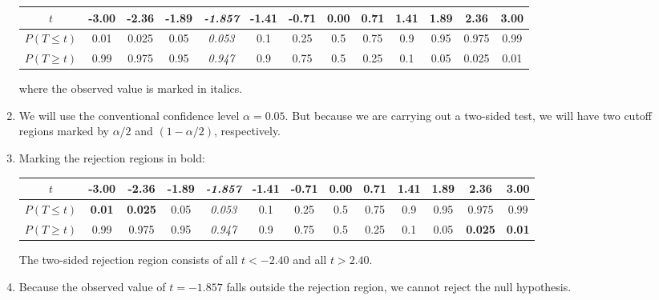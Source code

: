 \begin{enumerate}
  \begin{center}
    \begin{tabular}{c|c@{\gap}c@{\gap}c@{\gap}c@{\gap}
        c@{\gap}c@{\gap}c@{\gap}c@{\gap}c@{\gap}c@{\gap}c@{\gap}c}
      $t$ & -3.00 & -2.36 & -1.89 & \textit{-1.857} & -1.41 & -0.71 &
      0.00 & 0.71 & 1.41 & 1.89 & 2.36 & 3.00 \\ \hline
      $P(T\leq{t})$ & 0.01 & 0.025 & 0.05 & \textit{0.053} & 0.1 & 0.25 &
      0.5 & 0.75 & 0.9 & 0.95 & 0.975 & 0.99 \\
      $P(T\geq{t})$ & 0.99 & 0.975 & 0.95 & \textit{0.947} & 0.9 & 0.75 & 0.5 &
      0.25 & 0.1 & 0.05 & 0.025 & 0.01
    \end{tabular}
  \end{center}
  
  \noindent where the observed value is marked in italics.
  
\item We will use the conventional confidence level $\alpha =
  0.05$. But because we are carrying out a two-sided test, we will
  have two cutoff regions marked by $\alpha/2$ and $(1-\alpha/2)$,
  respectively.

\item Marking the rejection regions in bold:
  
  \begin{center}
    \begin{tabular}{c|c@{\gap}c@{\gap}c@{\gap}c@{\gap}
        c@{\gap}c@{\gap}c@{\gap}c@{\gap}c@{\gap}c@{\gap}c@{\gap}c}
      $t$ & \textbf{-3.00} & \textbf{-2.36} & 
      -1.89 & \emph{-1.857} & -1.41 & -0.71 & 0.00 & 0.71 & 1.41 & 1.89 &
      \textbf{2.36} & \textbf{3.00} \\ \hline
      $P(T\leq{t})$ & \textbf{0.01} & \textbf{0.025} &
      0.05 & \textit{0.053} & 0.1 & 0.25 &
      0.5 & 0.75 & 0.9 & 0.95 & 0.975 & 0.99 \\
      $P(T\geq{t})$ & 0.99 & 0.975 & 0.95 & \textit{0.947} & 0.9 & 0.75 & 0.5 &
      0.25 & 0.1 & 0.05 & \textbf{0.025} & \textbf{0.01}
    \end{tabular}
  \end{center}

  The two-sided rejection region consists of all $t<-2.40$ and all
  $t>{2.40}$.

\item Because the observed value of $t=-1.857$ falls outside the
  rejection region, we cannot reject the null hypothesis.

\end{enumerate}

